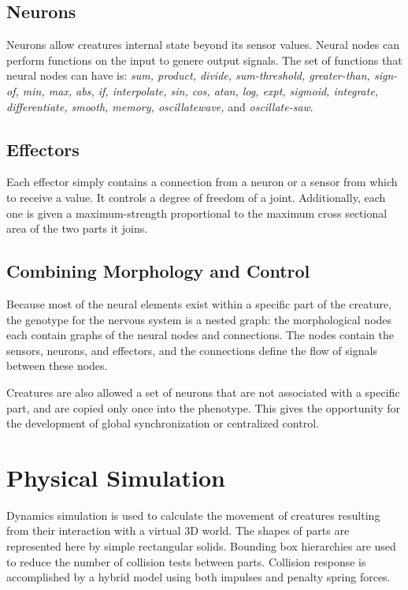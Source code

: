 \documentclass[../main.tex]{subfiles}
\begin{document}
\subsection{Neurons}

Neurons allow creatures internal state beyond its sensor values. Neural nodes can perform functions on the input to
genere output signals. The set of functions that neural nodes can have is: \emph{ sum, product, divide, sum-threshold,
greater-than, sign-of, min, max, abs, if, interpolate, sin, cos, atan, log, expt, sigmoid, integrate, differentiate,
smooth, memory, oscillatewave,} and \emph{oscillate-saw}.

\subsection{Effectors}
Each effector simply contains a connection from a neuron or a sensor from which to receive a value. It
controls a degree of freedom of a joint. Additionally, each one is given a maximum-strength proportional to the maximum
cross sectional area of the two parts it joins.

\subsection{Combining Morphology and Control}

Because most of the neural elements exist within a specific part of the creature, the genotype for the nervous system is
a nested graph: the morphological nodes each contain graphs of the neural nodes and connections. The nodes contain the
sensors, neurons, and effectors, and the connections define the flow of signals between these nodes.

Creatures are also allowed a set of neurons that are not associated with a specific part, and are copied only once into
the phenotype. This gives the opportunity for the development of global synchronization or centralized control.

\section{Physical Simulation}
Dynamics simulation is used to calculate the movement of creatures resulting from their interaction with a virtual 3D
world. The shapes of parts are represented here by simple rectangular solids.  Bounding box hierarchies are used to
reduce the number of collision tests between parts. Collision response is accomplished by a hybrid model using both
impulses and penalty spring forces.
\end{document}

